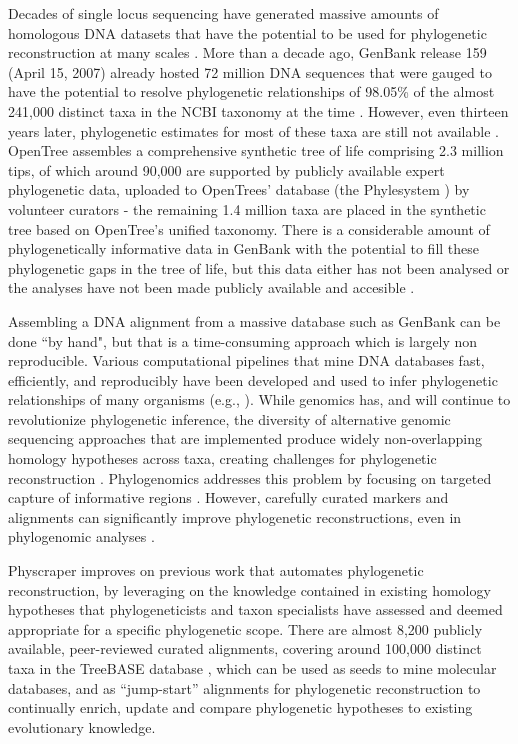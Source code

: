 \documentclass{bmcart}
\begin{document}
Decades of single locus sequencing have generated
massive amounts of homologous DNA datasets that have the potential to be used for phylogenetic
reconstruction at many scales \cite{sanderson2008phylota}.
More than a decade ago, GenBank release 159 (April 15, 2007) already hosted 72
million DNA sequences that were gauged to have the potential to resolve phylogenetic
relationships of 98.05\% of the almost 241,000
distinct taxa in the NCBI taxonomy at the time \cite{sanderson2008phylota}.
However, even thirteen years later, phylogenetic estimates for most of these taxa
are still not available \cite{mctavish_how_2017}.
OpenTree assembles a comprehensive synthetic tree of life comprising
2.3 million tips, of which around
90,000 are supported by publicly available expert phylogenetic data, uploaded to OpenTrees' database (the Phylesystem
\cite{mctavish2015phylesystem}) by volunteer curators - the remaining 1.4 million taxa are placed
in the synthetic tree based on OpenTree's unified taxonomy.
There is a considerable amount of phylogenetically
informative data in GenBank with the potential to fill these phylogenetic gaps in
the tree of life, but this data either has not been analysed or the analyses
have not been made publicly available and accesible \cite{mctavish_how_2017}.

Assembling a DNA alignment from a massive database such as GenBank can be done ``by hand",
but that is a time-consuming approach which is largely non reproducible.
Various computational pipelines that mine DNA databases fast, efficiently, and reproducibly
have been developed and used to infer phylogenetic relationships of many organisms
(e.g., \cite{smith2009mega, antonelli2017toward, izquierdo2014pumper, pearse2013phylogenerator}).
While genomics has, and will continue to revolutionize phylogenetic inference,
the diversity of alternative genomic sequencing approaches that are implemented produce
widely non-overlapping homology hypotheses across taxa,
creating challenges for phylogenetic reconstruction \cite{jones2016targeted}.
Phylogenomics addresses this problem by focusing on targeted capture of informative
regions \cite{andermann2020guide}.
However, carefully curated markers and alignments can significantly improve phylogenetic
reconstructions, even in phylogenomic analyses \cite{fragoso2017pilot}.

Physcraper improves on previous work that automates phylogenetic reconstruction, by leveraging
on the knowledge contained in existing homology hypotheses that phylogeneticists and taxon specialists have assessed
and deemed appropriate for a specific phylogenetic scope.
There are almost 8,200 publicly available, peer-reviewed curated alignments, covering
around 100,000 distinct taxa in the TreeBASE database
\cite{piel2009treebase, vos2012nexml, piel2018treebasedmp},
which can be used as seeds to mine molecular databases, and as ``jump-start'' alignments
for phylogenetic reconstruction \cite{morrison2006multiple} to continually enrich,
update and compare phylogenetic hypotheses to existing evolutionary knowledge.
\end{document}
